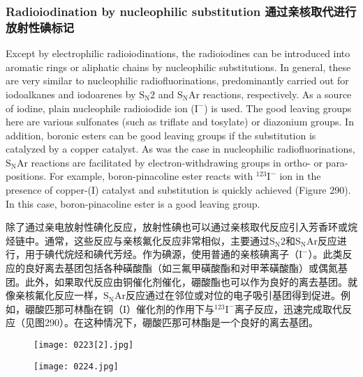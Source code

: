 \documentclass[dvipsnames, svgnames,a4paper,11pt]{article}
\begin{document}
\subsubsection{Radioiodination by nucleophilic substitution 通过亲核取代进行放射性碘标记}  
Except by electrophilic radioiodinations, the radioiodines can be introduced into aromatic rings or aliphatic chains by nucleophilic substitutions. In general, these are very similar to nucleophilic radiofluorinations, predominantly carried out for iodoalkanes and iodoarenes by $\mathrm{S_N2}$ and $\mathrm{S_NAr}$ reactions, respectively. As a source of iodine, plain nucleophile radioiodide ion (\(\mathrm{I^-}\)) is used. The good leaving groups here are various sulfonates (such as triflate and tosylate) or diazonium groups. In addition, boronic esters can be good leaving groups if the substitution is catalyzed by a copper catalyst. As was the case in nucleophilic radiofluorinations, $\mathrm{S_NAr}$ reactions are facilitated by electron-withdrawing groups in ortho- or para- positions. For example, boron-pinacoline ester reacts with \(\mathrm{^{123}I^-}\) ion in the presence of copper-(I) catalyst and substitution is quickly achieved (Figure 290). In this case, boron-pinacoline ester is a good leaving group.  

除了通过亲电放射性碘化反应，放射性碘也可以通过亲核取代反应引入芳香环或烷烃链中。通常，这些反应与亲核氟化反应非常相似，主要通过$\mathrm{S_N2}$和$\mathrm{S_NAr}$反应进行，用于碘代烷烃和碘代芳烃。作为碘源，使用普通的亲核碘离子（\(\mathrm{I^-}\)）。此类反应的良好离去基团包括各种磺酸酯（如三氟甲磺酸酯和对甲苯磺酸酯）或偶氮基团。此外，如果取代反应由铜催化剂催化，硼酸酯也可以作为良好的离去基团。就像亲核氟化反应一样，$\mathrm{S_NAr}$反应通过在邻位或对位的电子吸引基团得到促进。例如，硼酸匹那可林酯在铜（I）催化剂的作用下与\(\mathrm{^{123}I^-}\)离子反应，迅速完成取代反应（见图290）。在这种情况下，硼酸匹那可林酯是一个良好的离去基团。  

\begin{figure}[h]
	\centering
    \texttt{[image: 0223[2].jpg]}  
     \label{fig290}
\end{figure}

\begin{figure}[h]
	\centering
    \texttt{[image: 0224.jpg]}  
     \label{fig291}
\end{figure}
\end{document}
